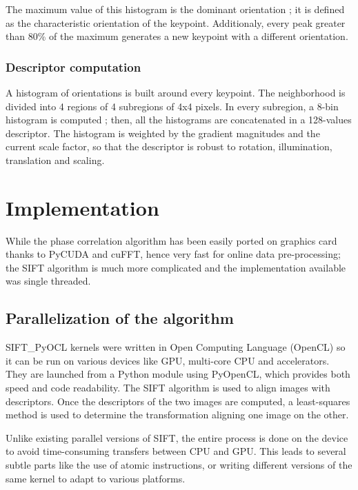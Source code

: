 \documentclass[preprint]{iucr}
\begin{document}
The maximum value of this histogram is the dominant orientation ; it is defined as the characteristic orientation of the keypoint. Additionaly, every peak greater than 80\% of the maximum generates a new keypoint with a different orientation.



\subsubsection{Descriptor computation}
A histogram of orientations is built around every keypoint. The neighborhood is divided into 4 regions of 4 subregions of 4x4 pixels. In every subregion, a 8-bin histogram is computed ; then, all the histograms are concatenated in a 128-values descriptor. The histogram is weighted by the gradient magnitudes and the current scale factor, so that the descriptor is robust to rotation, illumination, translation and scaling.

\section{Implementation}
While the phase correlation algorithm has been easily ported on graphics card
thanks to PyCUDA and cuFFT, hence very fast for online data
pre-processing; 
the SIFT algorithm is much more complicated and the implementation available was
single threaded.

\subsection{Parallelization of the algorithm}
SIFT\_PyOCL kernels were written in Open Computing Language\cite{opencl} (OpenCL) so it can be run on various devices like GPU, multi-core CPU and accelerators. They are launched from a Python module using PyOpenCL\cite{pyopencl}, which provides both speed and code readability. The SIFT algorithm is used to align images with descriptors. Once the descriptors of the two images are computed, a least-squares method is used to determine the transformation aligning one image on the other.

Unlike existing parallel versions of SIFT\cite{lu,rister,vasilyev}, the entire process is done on the device to avoid time-consuming transfers between CPU and GPU. This leads to several subtle parts like the use of atomic instructions, or writing different versions of the same kernel to adapt to various platforms.
\end{document}
